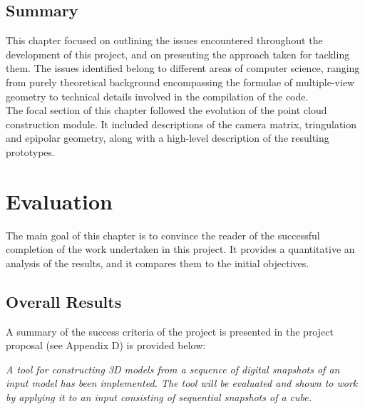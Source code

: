 \documentclass[12pt,a4paper,twoside,openright]{report}
\begin{document}
\section{Summary} 
This chapter focused on outlining the issues encountered throughout the development of this project, and on presenting the approach taken for tackling them. The issues identified belong to different areas of computer science, ranging from purely theoretical background encompassing the formulae of multiple-view geometry to technical details involved in the compilation of the code. \\
\linebreak
The focal section of this chapter followed the evolution of the point cloud construction module. It included descriptions of the camera matrix, tringulation and epipolar geometry, along with a high-level description of the resulting prototypes.

\chapter{Evaluation}
The main goal of this chapter is to convince the reader of the successful completion of the work undertaken in this project. It provides a quantitative an analysis of the results, and it compares them to the initial objectives.  

\section{Overall Results}
A summary of the success criteria of the project is presented in the project proposal (see Appendix D) is provided below:\\
\linebreak
\begin{adjustwidth}{0.7cm}{}
\emph{A tool for constructing 3D models from a sequence of digital snapshots of an input model has been implemented. The tool will be evaluated
and shown to work by applying it to an input consisting of sequential snapshots of a cube.}\\
\linebreak
\end{adjustwidth} 
\end{document}
